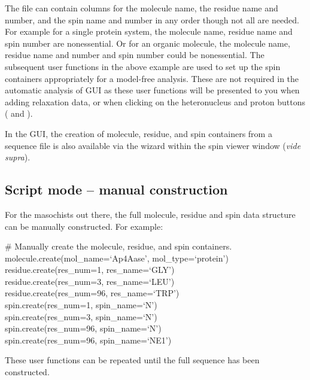 The file can contain columns for the molecule name, the residue name and number, and the spin name and number in any order though not all are needed.  For example for a single protein system, the molecule name, residue name and spin number are nonessential.  Or for an organic molecule, the molecule name, residue name and number and spin number could be nonessential.  The subsequent user functions in the above example are used to set up the spin containers appropriately for a model-free analysis.  These are not required in the automatic analysis of GUI as these user functions will be presented to you when adding relaxation data, or when clicking on the heteronucleus and proton buttons ( and ).

In the GUI, the creation of molecule, residue, and spin containers from a sequence file is also available via the  wizard within the spin viewer window (\textit{vide supra}).



\subsection{Script mode -- manual construction} \label{sect: script - manual construction}

For the masochists out there, the full molecule, residue and spin data structure can be manually constructed.  For example:

\begin{exampleenv}
\# Manually create the molecule, residue, and spin containers. \\
molecule.create(mol\_name=`Ap4Aase', mol\_type=`protein') \\
residue.create(res\_num=1,  res\_name=`GLY') \\
residue.create(res\_num=3,  res\_name=`LEU') \\
residue.create(res\_num=96, res\_name=`TRP') \\
spin.create(res\_num=1,  spin\_name=`N') \\
spin.create(res\_num=3,  spin\_name=`N') \\
spin.create(res\_num=96, spin\_name=`N') \\
spin.create(res\_num=96, spin\_name=`NE1')
\end{exampleenv}

These user functions can be repeated until the full sequence has been constructed.



